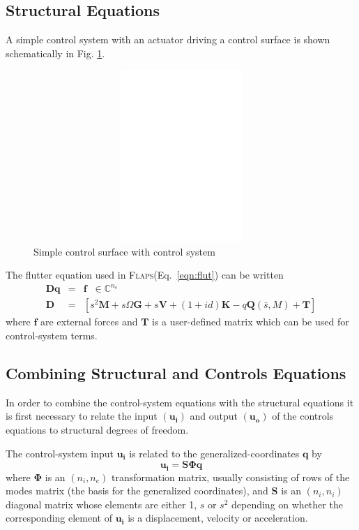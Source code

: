 \documentclass[11pt,openany,twoside]{book}
\numberwithin{equation}{section}		%
\newcommand{\Flaps}{\textsc{Flaps\:}}
\newcommand{\Matrix}[1]{\boldsymbol{#1}}
\newcommand{\Vector}[1]{\boldsymbol{#1}}
\newcommand{\Eqn}[1]{Eq.\ \ref{#1}}  %
\newcommand{\Figref}[1]{Fig. \ref{#1}}  %
\begin{document}
\subsection{Structural Equations}
A simple control system with an actuator driving a control surface
is shown schematically in \Figref{fig:lti-schematic}.
\begin{figure}[ht]
		\includegraphics[height=6.5cm,width=12cm]{lti-schematic.eps}
	\centering
	\caption{Simple control surface with control system}\label{fig:lti-schematic}
\end{figure}
The flutter equation used in \Flaps (\Eqn{eqn:flut}) can be written
\begin{eqnarray}\label{eqn:lti-struct}
\Vector{Dq} &=& \Vector{f} \;\; \in \mathbb{C}^{n_e} \nonumber \\
\Matrix{D} &=&
	\left[ s^2 \Matrix{M} + s \Omega\Matrix{G} + s \Matrix{V} +
	 (1 + id) \Matrix{K} - q \Matrix{Q} (\bar{s},M) + \Matrix{T} \right]
\end{eqnarray}
where $\Vector{f}$ are external forces and $\Matrix{T}$ is
a user-defined matrix which can be used for control-system terms.

\subsection{Combining Structural and Controls Equations}
\par
{}
In order to combine the control-system equations with the structural
equations it is first necessary to relate the input $(\Vector{u_i})$
and output $(\Vector{u_o})$ of the controls equations to structural degrees
of freedom.

The control-system input $\Vector{u_i}$ is related to the generalized-coordinates
$\Vector{q}$ by
\begin{equation}\label{eqn:abcd-uq}
\Vector{u_i} = \Matrix{S\Phi} \Vector{q}
\end{equation}
\index{=Phi@$\Matrix{\Phi}$!LTI}
where $\Matrix{\Phi}$ is an $(n_i,n_e)$ transformation matrix,
usually consisting of rows of the modes matrix (the basis for
the generalized coordinates), and $\Matrix{S}$ is an $(n_i,n_i)$
diagonal matrix whose elements are either 1, $s$ or $s^2$ depending
on whether the corresponding element of $\Vector{u_i}$ is a displacement,
velocity or acceleration.
\end{document}
